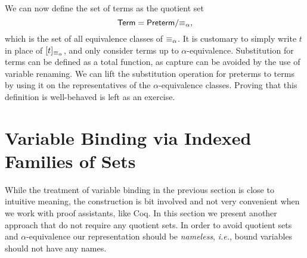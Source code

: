 We can now define the set of terms as the quotient set
\[ \mathsf{Term} = \mathsf{Preterm} / {\equiv_\alpha}, \]
which is the set of all equivalence classes of $\equiv_\alpha$. It is customary to
simply write $t$ in place of $[t]_{\equiv_\alpha}$, and only consider terms up to
$\alpha$-equivalence. Substitution for terms can be defined as a total
function, as capture can be avoided by the use of variable renaming.
We can lift the substitution operation for preterms to terms by using it on the
representatives of the $\alpha$-equivalence classes. Proving that this
definition is well-behaved is left as an exercise.

\section{Variable Binding via Indexed Families of Sets}

\newcommand\ITerm[1]{\syncatset{Term}_{#1}}
\newcommand\ITVar[1]{\ulcorner\! #1 \!\urcorner}
\newcommand\ITSucc{\mathsf{s}}
\newcommand\ITInc[1]{#1\!+\!1}

While the treatment of variable binding in the previous section is close
to intuitive meaning, the construction is bit involved and not very convenient
when we work with proof assistants, like Coq.
In this section we present another approach that do not require
any quotient sets.
In order to avoid quotient sets and $\alpha$-equivalence our representation
should be \emph{nameless}, \emph{i.e.}, bound variables should not have
any names.


